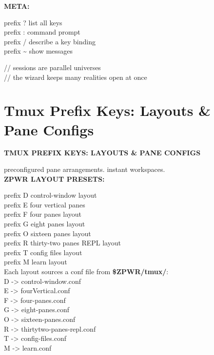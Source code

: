 \documentclass[11pt,a4paper,twoside]{book}
\begin{document}
\vspace{12pt}
{\bfseries\color{neonyellow} META:}\vspace{4pt}

prefix ?              list all keys\\
prefix :              command prompt\\
prefix /              describe a key binding\\
prefix \textasciitilde{}              show messages\\

\begin{codebox}
\color{neongreen}// sessions are parallel universes\\
\color{neongreen}// the wizard keeps many realities open at once\\
\end{codebox}


\vspace{16pt}

\section{Tmux Prefix Keys: Layouts \& Pane Configs}


\vspace{10pt}
{\large\bfseries\color{neoncyan} TMUX PREFIX KEYS: LAYOUTS \& PANE CONFIGS}\vspace{6pt}

preconfigured pane arrangements. instant workspaces.\\


\vspace{12pt}
{\bfseries\color{neonyellow} \textbf{ZPWR} LAYOUT PRESETS:}\vspace{4pt}

prefix D              control-window layout\\
prefix E              four vertical panes\\
prefix F              four panes layout\\
prefix G              eight panes layout\\
prefix O              sixteen panes layout\\
prefix R              thirty-two panes REPL layout\\
prefix T              config files layout\\
prefix M              learn layout\\

Each layout sources a conf file from \textbf{\$ZPWR/tmux/}:\\
D -> control-window.conf\\
E -> fourVertical.conf\\
F -> four-panes.conf\\
G -> eight-panes.conf\\
O -> sixteen-panes.conf\\
R -> thirtytwo-panes-repl.conf\\
T -> config-files.conf\\
M -> learn.conf\\
\end{document}
